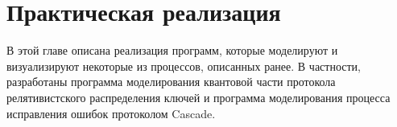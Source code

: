 \chapter{Практическая реализация}
В этой главе описана реализация программ, которые моделируют и визуализируют некоторые из процессов, описанных ранее. В частности, разработаны программа моделирования квантовой части протокола релятивистского распределения ключей и программа моделирования процесса исправления ошибок протоколом Cascade.



